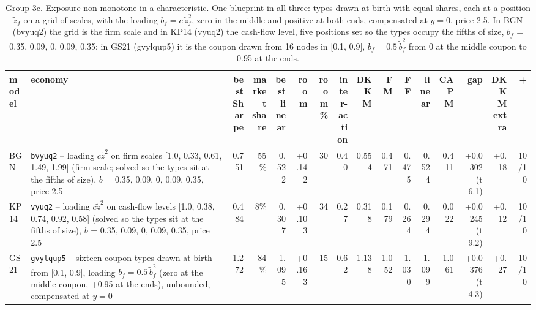 \begin{table}[htbp]\centering\footnotesize\setlength{\tabcolsep}{2pt}
\caption{Group 3c. Exposure non-monotone in a characteristic. One blueprint in all three: types drawn at birth with equal shares, each at a position $\tilde z_f$ on a grid of scales, with the loading $b_f = c\,\tilde z_f^2$, zero in the middle and positive at both ends, compensated at $y = 0$, price 2.5. In BGN (bvyuq2) the grid is the firm scale and in KP14 (vyuq2) the cash-flow level, five positions set so the types occupy the fifths of size, $b_f$ = 0.35, 0.09, 0, 0.09, 0.35; in GS21 (gvylqup5) it is the coupon drawn from 16 nodes in [0.1, 0.9], $b_f = 0.5\,\tilde b_f^2$ from 0 at the middle coupon to 0.95 at the ends.}\label{tab:g3c}
\begin{adjustbox}{max width=\textwidth}\begin{tabular}{l>{\raggedright\arraybackslash}p{3.6cm}rrrrrrrrrrrrrr}\hline
model & economy & \shortstack[r]{best\\Sharpe} & \shortstack[r]{market\\share} & \shortstack[r]{best\\linear} & room & \shortstack[r]{room\\\%} & \shortstack[r]{inter-\\action} & DKKM & FM & FF & linear & CAPM & gap & \shortstack[r]{DKKM\\extra} & + \\\hline
BGN & \texttt{bvyuq2} -- loading $c\tilde z^2$ on firm scales [1.0, 0.33, 0.61, 1.49, 1.99] (firm scale; solved so the types sit at the fifths of size), $b$ = 0.35, 0.09, 0, 0.09, 0.35, price 2.5 & 0.751 & 55\% & 0.522 & +0.142 & 30 & 0.40 & 0.554 & 0.471 & 0.475 & 0.524 & 0.411 & +0.0302 (t 6.1) & +0.18 & 10/10 \\
KP14 & \texttt{vyuq2} -- loading $c\tilde z^2$ on cash-flow levels [1.0, 0.38, 0.74, 0.92, 0.58] (solved so the types sit at the fifths of size), $b$ = 0.35, 0.09, 0, 0.09, 0.35, price 2.5 & 0.484 & 8\% & 0.307 & +0.103 & 34 & 0.27 & 0.318 & 0.179 & 0.264 & 0.294 & 0.022 & +0.0245 (t 9.2) & +0.12 & 10/10 \\
GS21 & \texttt{gvylqup5} -- sixteen coupon types drawn at birth from [0.1, 0.9], loading $b_f = 0.5\,\tilde b_f^2$ (zero at the middle coupon, +0.95 at the ends), unbounded, compensated at $y = 0$ & 1.272 & 84\% & 1.095 & +0.163 & 15 & 0.62 & 1.138 & 1.052 & 1.030 & 1.099 & 1.061 & +0.0376 (t 4.3) & +0.27 & 10/10 \\
\hline\end{tabular}\end{adjustbox}\end{table}
